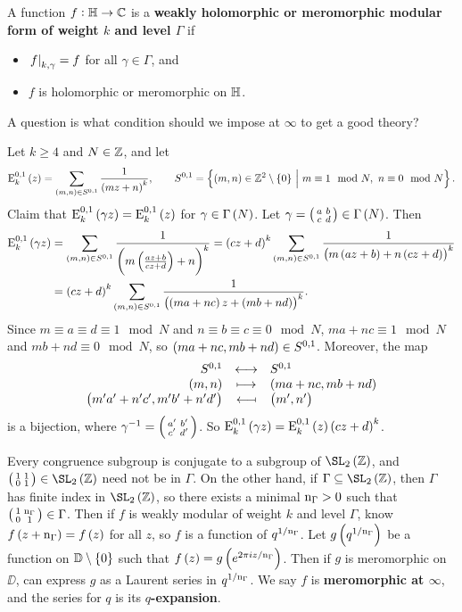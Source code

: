 \begin{definition}
A function $ f : \mathbb{H} \to \mathbb{C} $ is a \textbf{weakly holomorphic or meromorphic modular form of weight $ k $ and level $ \Gamma $} if
\begin{itemize}
\item $ \left. f \right|_{k, \gamma} = f $ for all $ \gamma \in \Gamma $, and
\item $ f $ is holomorphic or meromorphic on $ \mathbb{H} $.
\end{itemize}
\end{definition}

A question is what condition should we impose at $ \infty $ to get a good theory?

\begin{example*}
Let $ k \ge 4 $ and $ N \in \mathbb{Z} $, and let
$$ \E_k^{0, 1}\br{z} = \sum_{\br{m, n} \in S^{0, 1}} \dfrac{1}{\br{mz + n}^k}, \qquad S^{0, 1} = \cbr{\br{m, n} \in \ZZ^2 \setminus \cbr{0} \st m \equiv 1 \mod N, \ n \equiv 0 \mod N}. $$
Claim that $ \E_k^{0, 1}\br{\gamma z} = \E_k^{0, 1}\br{z} $ for $ \gamma \in \Gamma\br{N} $. Let $ \gamma = \twobytwosmall{a}{b}{c}{d} \in \Gamma\br{N} $. Then
\begin{align*}
\E_k^{0, 1}\br{\gamma z}
& = \sum_{\br{m, n} \in S^{0, 1}} \dfrac{1}{\br{m\br{\tfrac{az + b}{cz + d}} + n}^k}
= \br{cz + d}^k\sum_{\br{m, n} \in S^{0, 1}} \dfrac{1}{\br{m\br{az + b} + n\br{cz + d}}^k} \\
& = \br{cz + d}^k\sum_{\br{m, n} \in S^{0, 1}} \dfrac{1}{\br{\br{ma + nc}z + \br{mb + nd}}^k}.
\end{align*}
Since $ m \equiv a \equiv d \equiv 1 \mod N $ and $ n \equiv b \equiv c \equiv 0 \mod N $, $ ma + nc \equiv 1 \mod N $ and $ mb + nd \equiv 0 \mod N $, so $ \br{ma + nc, mb + nd} \in S^{0, 1} $. Moreover, the map
$$ \bijection{S^{0, 1}}{S^{0, 1}}{\br{m, n}}{\br{ma + nc, mb + nd}}{\br{m'a' + n'c', m'b' + n'd'}}{\br{m', n'}} $$
is a bijection, where $ \gamma^{-1} = \begin{psmallmatrix} a' & b' \\ c' & d' \end{psmallmatrix} $. So $ \E_k^{0, 1}\br{\gamma z} = \E_k^{0, 1}\br{z}\br{cz + d}^k $.
\end{example*}


Every congruence subgroup is conjugate to a subgroup of $ \SL_2\br{\ZZ} $, and $ \twobytwosmall{1}{1}{0}{1} \in \SL_2\br{\ZZ} $ need not be in $ \Gamma $. On the other hand, if $ \Gamma \subseteq \SL_2\br{\ZZ} $, then $ \Gamma $ has finite index in $ \SL_2\br{\ZZ} $, so there exists a minimal $ \mathrm{n}_\Gamma > 0 $ such that $ \begin{psmallmatrix} 1 & \mathrm{n}_\Gamma \\ 0 & 1 \end{psmallmatrix} \in \Gamma $. Then if $ f $ is weakly modular of weight $ k $ and level $ \Gamma $, know $ f\br{z + \n_\Gamma} = f\br{z} $ for all $ z $, so $ f $ is a function of $ q^{1 / \mathrm{n}_\Gamma} $. Let $ g\br{q^{1 / \n_\Gamma}} $ be a function on $ \DD \setminus \cbr{0} $ such that $ f\br{z} = g\br{e^{2\pi iz / \n_\Gamma}} $. Then if $ g $ is meromorphic on $ \DD $, can express $ g $ as a Laurent series in $ q^{1 / \mathrm{n}_\Gamma} $. We say $ f $ is \textbf{meromorphic at $ \infty $}, and the series for $ q $ is its \textbf{$ q $-expansion}.

